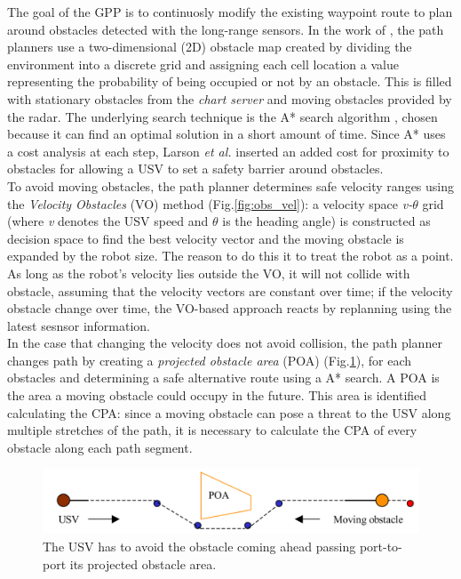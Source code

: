 \documentclass[12pt]{article}
\begin{document}
              The goal of the GPP is to continuosly modify the existing waypoint route to plan around obstacles detected with the long-range sensors. In the work of \textcite{Larson2007,Larson2007a}, the path planners use a two-dimensional (2D) obstacle map created by dividing the environment into a discrete grid and assigning each cell location a value representing the probability of being occupied or not by an obstacle. This is filled with stationary obstacles from the \textit{chart server} and moving obstacles provided by the radar. The underlying search technique is the A* search algorithm \parencite{4082128}, chosen because it can find an optimal solution in a short amount of time. Since A* uses a cost analysis at each step, Larson \textit{et al.} inserted an added cost for proximity to obstacles for allowing a USV to set a safety barrier around obstacles.\\
              To avoid moving obstacles, the path planner determines safe velocity ranges using the \textit{Velocity Obstacles} (VO) method (Fig.\ref{fig:obs_vel}): a velocity space \textit{v-$\theta$} grid (where \textit{v} denotes the USV speed and \textit{$\theta$} is the heading angle) is constructed as decision space to find the best velocity vector and the moving obstacle is expanded by the robot size. The reason to do this it to treat the robot as a point. As long as the robot's velocity lies outside the VO, it will not collide with obstacle, assuming that the velocity vectors are constant over time; if the velocity obstacle change over time, the VO-based approach reacts by replanning using the latest sesnsor information.\\
              In the case that changing the velocity does not avoid collision, the path planner changes path by creating a \textit{projected obstacle area} (POA) (Fig.\ref{fig:poa}), for each obstacles and determining a safe alternative route using a A* search. A POA is the area a moving obstacle could occupy in the future. This area is identified calculating the CPA: since a moving obstacle can pose a threat to the USV along multiple stretches of the path, it is necessary to calculate the CPA of every obstacle along each path segment.

              \begin{figure}
                    \centering
                    \includegraphics[width=\columnwidth]{./Images/Larson/poa}
                    \caption{The USV has to avoid the obstacle coming ahead passing port-to-port its projected obstacle area.}
                    \label{fig:poa}
              \end{figure}
\end{document}

